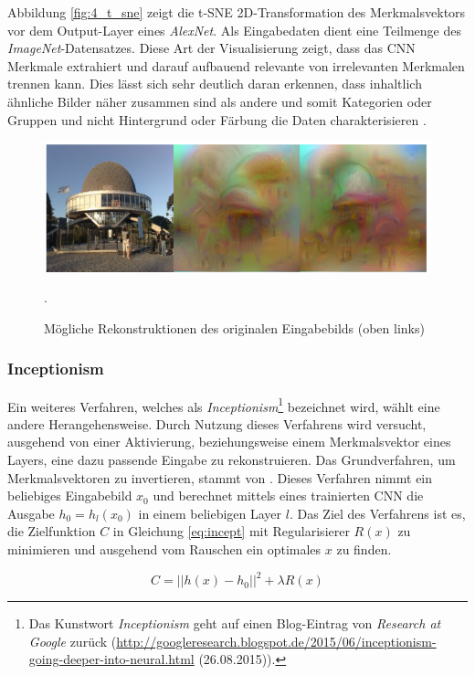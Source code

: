 Abbildung \ref{fig:4_t_sne} zeigt die t-SNE 2D-Transformation des Merkmalsvektors vor dem Output-Layer eines \textit{AlexNet}. Als Eingabedaten dient eine Teilmenge des \textit{ImageNet}-Datensatzes. Diese Art der Visualisierung zeigt, dass das CNN Merkmale extrahiert und darauf aufbauend relevante von irrelevanten Merkmalen trennen kann. Dies lässt sich sehr deutlich daran erkennen, dass inhaltlich ähnliche Bilder näher zusammen sind als andere und somit Kategorien oder Gruppen und nicht Hintergrund oder Färbung die Daten charakterisieren \cite[vgl.][]{Bell2015}.


\begin{figure}
\centering
\includegraphics[width=0.5\linewidth]{images/4_inceptionismb}
\caption[]{Mögliche Rekonstruktionen des originalen Eingabebilds (oben links) \cite[siehe][]{Simard2003}}.
\label{fig:4_inceptionism}
\end{figure}

\subsubsection{Inceptionism}
Ein weiteres Verfahren, welches als \textit{Inceptionism}\footnote{Das Kunstwort \textit{Inceptionism} geht auf einen Blog-Eintrag von \textit{Research at Google} zurück (\url{http://googleresearch.blogspot.de/2015/06/inceptionism-going-deeper-into-neural.html} (26.08.2015)).} bezeichnet wird, wählt eine andere Herangehensweise. Durch Nutzung dieses Verfahrens wird versucht, ausgehend von einer Aktivierung, beziehungsweise einem Merkmalsvektor eines Layers, eine dazu passende Eingabe zu rekonstruieren. 
Das Grundverfahren, um Merkmalsvektoren zu invertieren, stammt von \cite{Mahendran2014}. Dieses Verfahren nimmt ein beliebiges Eingabebild $x_0$ und berechnet mittels eines trainierten CNN die Ausgabe $h_0 = h_l(x_0)$ in einem beliebigen Layer $l$. Das Ziel des Verfahrens ist es, die Zielfunktion $C$ in Gleichung \ref{eq:incept} mit Regularisierer $R(x)$ zu minimieren und ausgehend vom Rauschen ein optimales $x$ zu finden. 

\begin{equation}
\label{eq:incept}
C = ||h(x) - h_0||^2 + \lambda R(x)
\end{equation}

